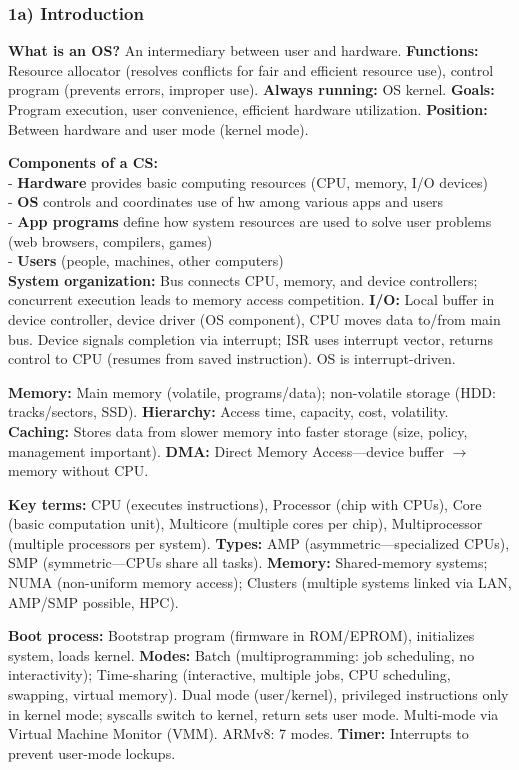 \subsubsection*{1a) Introduction}

\textbf{What is an OS?} An intermediary between user and hardware. \textbf{Functions:} Resource allocator (resolves conflicts for fair and efficient resource use), control program (prevents errors, improper use). \textbf{Always running:} OS kernel. \textbf{Goals:} Program execution, user convenience, efficient hardware utilization. \textbf{Position:} Between hardware and user mode (kernel mode).

\textbf{Components of a CS:}\\
- \textbf{Hardware} provides basic computing resources (CPU, memory, I/O devices)\\
- \textbf{OS} controls and coordinates use of hw among various apps and users\\
- \textbf{App programs} define how system resources are used to solve user problems (web browsers, compilers, games)\\
- \textbf{Users} (people, machines, other computers)\\

\textbf{System organization:} Bus connects CPU, memory, and device controllers; concurrent execution leads to memory access competition. \textbf{I/O:} Local buffer in device controller, device driver (OS component), CPU moves data to/from main bus. Device signals completion via interrupt; ISR uses interrupt vector, returns control to CPU (resumes from saved instruction). OS is interrupt-driven.

\textbf{Memory:} Main memory (volatile, programs/data); non-volatile storage (HDD: tracks/sectors, SSD). \textbf{Hierarchy:} Access time, capacity, cost, volatility. \textbf{Caching:} Stores data from slower memory into faster storage (size, policy, management important). \textbf{DMA:} Direct Memory Access—device buffer $\rightarrow$ memory without CPU.

\textbf{Key terms:} CPU (executes instructions), Processor (chip with CPUs), Core (basic computation unit), Multicore (multiple cores per chip), Multiprocessor (multiple processors per system). \textbf{Types:} AMP (asymmetric—specialized CPUs), SMP (symmetric—CPUs share all tasks). \textbf{Memory:} Shared-memory systems; NUMA (non-uniform memory access); Clusters (multiple systems linked via LAN, AMP/SMP possible, HPC).

\textbf{Boot process:} Bootstrap program (firmware in ROM/EPROM), initializes system, loads kernel. \textbf{Modes:} Batch (multiprogramming: job scheduling, no interactivity); Time-sharing (interactive, multiple jobs, CPU scheduling, swapping, virtual memory). Dual mode (user/kernel), privileged instructions only in kernel mode; syscalls switch to kernel, return sets user mode. Multi-mode via Virtual Machine Monitor (VMM). ARMv8: 7 modes. \textbf{Timer:} Interrupts to prevent user-mode lockups.

